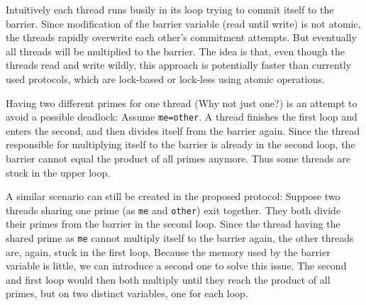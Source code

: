 \documentclass[a4paper, 10pt]{article}
\begin{document}
Intuitively each thread runs busily in its loop trying to commit itself to the barrier. Since modification of the barrier variable (read until write) is not atomic, the threads rapidly overwrite each other's commitment attempts. But eventually all threads will be multiplied to the barrier. The idea is that, even though the threads read and write wildly, this approach is potentially faster than currently used protocols, which are lock-based or lock-less using atomic operations.

Having two different primes for one thread (Why not just one?) is an attempt to avoid a possible deadlock: Assume \texttt{me=other}. A thread finishes the first loop and enters the second, and then divides itself from the barrier again. Since the thread responsible for multiplying itself to the barrier is already in the second loop, the barrier cannot equal the product of all primes anymore. Thus some threads are stuck in the upper loop.

A similar scenario can still be created in the proposed protocol: Suppose two threads sharing one prime (as \texttt{me} and \texttt{other}) exit together. They both divide their primes from the barrier in the second loop. Since the thread having the shared prime as \texttt{me} cannot multiply itself to the barrier again, the other threads are, again, stuck in the first loop. Because the memory used by the barrier variable is little, we can introduce a second one to solve this issue. The second and first loop would then both multiply until they reach the product of all primes, but on two distinct variables, one for each loop.
\end{document}

